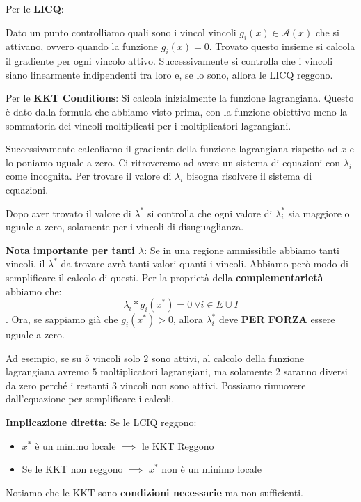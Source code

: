 Per le \textbf{LICQ}:

Dato un punto controlliamo quali sono i vincol vincoli $g_i(x) \in \mathcal{A}(x)$ che si attivano, ovvero quando la funzione $g_i(x) = 0$.
Trovato questo insieme si calcola il gradiente per ogni vincolo attivo. Successivamente si controlla che i vincoli siano 
linearmente indipendenti tra loro e, se lo sono, allora le LICQ reggono.

Per le \textbf{KKT Conditions}:
Si calcola inizialmente la funzione lagrangiana. Questo è dato dalla formula che abbiamo visto prima, con 
la funzione obiettivo meno la sommatoria dei vincoli moltiplicati per i moltiplicatori lagrangiani.

Successivamente calcoliamo il gradiente della funzione lagrangiana rispetto ad $x$ e lo poniamo uguale a zero. Ci ritroveremo 
ad avere un sistema di equazioni con $\lambda_i$ come incognita. Per trovare il valore di $\lambda_i$ bisogna
risolvere il sistema di equazioni.

Dopo aver trovato il valore di $\lambda^*$ si controlla che ogni valore di $\lambda_i^*$ sia maggiore o uguale a zero, 
solamente per i vincoli di disuguaglianza.

\textbf{Nota importante per tanti $\lambda$}: Se in una regione ammissibile abbiamo tanti vincoli, 
il $\lambda^*$ da trovare avrà tanti valori quanti i vincoli. Abbiamo però modo di semplificare 
il calcolo di questi. Per la proprietà della \textbf{complementarietà} abbiamo che:
$$\lambda_i * g_i(x^*) = 0 \ \forall i \in E \cup I$$. Ora, se sappiamo già che 
$g_i(x^*) >0$, allora $\lambda_i^*$ deve \textbf{PER FORZA} essere uguale a zero. 

Ad esempio, se su $5$ vincoli solo $2$ sono attivi, al calcolo della funzione lagrangiana
avremo $5$ moltiplicatori lagrangiani, ma solamente $2$ saranno diversi da zero perché
i restanti $3$ vincoli non sono attivi. Possiamo rimuovere dall'equazione per 
semplificare i calcoli. 

\textbf{Implicazione diretta}: Se le LCIQ reggono:

\begin{itemize}
    \item $x^*$ è un minimo locale $\implies$ le KKT Reggono
    \item Se le KKT non reggono $\implies$ $x^*$ non è un minimo locale
\end{itemize}

Notiamo che le KKT sono \textbf{condizioni necessarie} ma non sufficienti.

